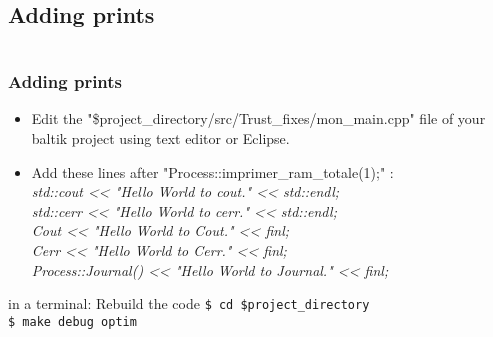 \documentclass[10pt, hyperref={unicode=true,pdfusetitle, bookmarks=true,bookmarksnumbered=false,bookmarksopen=false, breaklinks=false,pdfborder={0 0 1},backref=true,colorlinks=true,linkcolor=darkblue,pageanchor, urlcolor=darkblue}]{beamer}
\begin{document}
\subsection{{\bf{Adding prints}}}
\begin{frame}
\begin{columns}[c] 
\tableofcontents[sections={1-4},currentsection, currentsubsection]
\tableofcontents[sections={5-10},currentsection, currentsubsection]
\end{columns}
\end{frame}
\begin{frame}
\frametitle{Adding prints}

\begin{block}{}
\begin{itemize}
\item Edit the "\$project\_directory/src/Trust\_fixes/mon\_main.cpp" file of your baltik project using text editor or Eclipse.
\item Add these lines after "Process::imprimer\_ram\_totale(1);" :\\
\textit{std::cout <\textcompwordmark{}< "Hello World to cout." <\textcompwordmark{}< std::endl;\\
std::cerr <\textcompwordmark{}< "Hello World to cerr." <\textcompwordmark{}< std::endl;\\
Cout <\textcompwordmark{}< "Hello World to Cout." <\textcompwordmark{}< finl;\\
Cerr <\textcompwordmark{}< "Hello World to Cerr." <\textcompwordmark{}< finl;\\
Process::Journal() <\textcompwordmark{}< "Hello World to Journal." <\textcompwordmark{}< finl;}\\
\end{itemize}
\end{block}


\begin{block}{in a terminal: Rebuild the code}
\texttt{\$ cd \$project\_directory}\\
\texttt{\$ make debug optim}\\
\end{block}

\end{frame}
\end{document}
